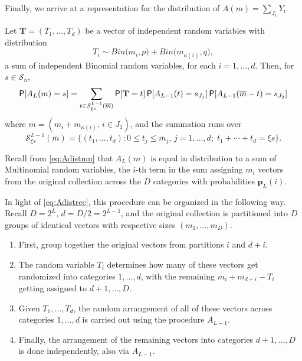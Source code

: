 \documentclass[11pt,draft]{article}
\newcommand{\Ssp}{\mathcal{S}}
\newcommand{\pv}{\mathbf{p}}
\newcommand{\mb}{\overline{m}}
\begin{document}
Finally, we arrive at a representation for the distribution of
$A(m) = \sum_{J_1} Y_i$.

\begin{prop}
Let $\mathbf{T} = (T_1,\dots,T_d)$ be a vector of independent random variables
with distribution
\[ T_i \sim Bin\big(m_i, p\big) + Bin\big(m_{\kappa(i)}, q\big), \]
a sum of independent Binomial random variables, for each $i = 1,\dots,d$.
Then, for $s \in \Ssp_n$,
\begin{equation}\label{eq:Adistrec}
\P[A_L(m) = s] = \sum_{t \in \Ssp_{\xi s}^{L-1}(\mb)}
\P[\mathbf{T} = t]
\P[A_{L-1}(t) = s_{J_1}] \P[A_{L-1}(\mb - t) = s_{J_2}]
\end{equation}
where $\mb = (m_i + m_{\kappa(i)},\, i\in J_1)$, and the summation runs over
\[ \Ssp_{\xi s}^{L-1}(\mb) =
\big\{ (t_1,\dots,t_d) : 0 \leq t_j \leq \mb_j,\, j = 1,\dots,d;\;
t_1 + \cdots + t_d = \xi s \big\}. \]
\end{prop}
Recall from \eqref{eq:Adistmn} that $A_L(m)$ is equal in distribution to a sum
of Multinomial random variables, the $i$-th term in the sum assigning $m_i$
vectors from the original collection across the $D$ categories with
probabilities $\pv_L(i)$.

In light of \eqref{eq:Adistrec}, this procedure can be organized in the
following way.
Recall $D = 2^L$, $d = D/2 = 2^{L-1}$, and the original collection is
partitioned into $D$ groups of identical vectors with respective sizes
$(m_1,\dots, m_D)$.
\begin{enumerate}
\item
First, group together the original vectors from partitions $i$ and $d + i$.

\item
The random variable $T_i$ determines how many of these vectors get
randomized into categories $1,\dots,d$, with the remaining
$m_i + m_{d + i} - T_i$ getting assigned to $d + 1,\dots, D$.

\item
Given $T_1,\dots,T_d$, the random arrangement of all of these vectors across
categories $1,\dots,d$ is carried out using the procedure $A_{L-1}$.

\item
Finally, the arrangement of the remaining vectors into categories
$d + 1,\dots,D$ is done independently, also via $A_{L-1}$.
\end{enumerate}
\end{document}
